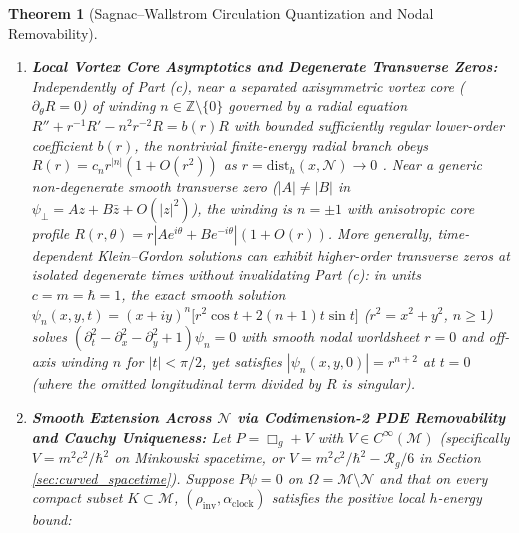 \documentclass[11pt, a4paper]{article}
\newtheorem{theorem}{Theorem}[section]
\theoremstyle{definition}
\begin{document}
\begin{theorem}[Sagnac--Wallstrom Circulation Quantization and Nodal Removability]
\begin{enumerate}[label=(\alph*)]
\begin{equation}
    \end{equation}
    enforcing the Wallstrom circulation condition $\oint_C dS = -mc^2 \Delta\tau_{\text{Sagnac}}(C) = 2\pi n \hbar$ (whereas on $\mathcal{U}_{\text{timelike}}$ the physical proper-time circulation is weighted by $m / M_{\text{eff}}(x)$, $\oint_C \beta_{\text{proper}} = \oint_C \frac{m}{M_{\text{eff}}(x)}\alpha_{\text{clock}}$, coinciding with $-n T_0$ when $M_{\text{eff}} = m$). On each connected component of $\Omega$, $(\rho_{\text{inv}}, \alpha_{\text{clock}})$ reconstructs a smooth non-vanishing complex field $\psi(x) = R(x)q(x) = \sqrt{\rho_{\text{inv}}(x)}\exp\left(\frac{i}{\hbar}\int_{x_0}^x dS\right) \in C^\infty(\Omega, \mathbb{C}^\times)$ unique up to a constant phase factor $e^{i\theta_0} \in U(1)$ per connected component.
    \item \textbf{Local Vortex Core Asymptotics and Degenerate Transverse Zeros:} Independently of Part (c), near a separated axisymmetric vortex core ($\partial_\theta R = 0$) of winding $n \in \mathbb{Z}\setminus\{0\}$ governed by a radial equation $R'' + r^{-1}R' - n^2 r^{-2}R = b(r)R$ with bounded sufficiently regular lower-order coefficient $b(r)$, the nontrivial finite-energy radial branch obeys $R(r) = c_n r^{|n|}(1 + O(r^2))$ as $r = \text{dist}_h(x, \mathcal{N}) \to 0$ \cite{Wallstrom1994, Schmelzer2011}. Near a generic non-degenerate smooth transverse zero ($|A| \neq |B|$ in $\psi_\perp = A z + B\bar{z} + O(|z|^2)$), the winding is $n = \pm 1$ with anisotropic core profile $R(r, \theta) = r\left|A e^{i\theta} + B e^{-i\theta}\right|(1 + O(r))$. More generally, time-dependent Klein--Gordon solutions can exhibit higher-order transverse zeros at isolated degenerate times without invalidating Part (c): in units $c = m = \hbar = 1$, the exact smooth solution $\psi_n(x, y, t) = (x + iy)^n\big[r^2\cos t + 2(n + 1)t\sin t\big]$ ($r^2 = x^2 + y^2$, $n \ge 1$) solves $(\partial_t^2 - \partial_x^2 - \partial_y^2 + 1)\psi_n = 0$ with smooth nodal worldsheet $r = 0$ and off-axis winding $n$ for $|t| < \pi/2$, yet satisfies $|\psi_n(x, y, 0)| = r^{n+2}$ at $t = 0$ (where the omitted longitudinal term divided by $R$ is singular).
    \item \textbf{Smooth Extension Across $\mathcal{N}$ via Codimension-2 PDE Removability and Cauchy Uniqueness:} Let $P = \Box_g + V$ with $V \in C^\infty(\mathcal{M})$ (specifically $V = m^2 c^2/\hbar^2$ on Minkowski spacetime, or $V = m^2 c^2/\hbar^2 - \mathcal{R}_g/6$ in Section \ref{sec:curved_spacetime}). Suppose $P\psi = 0$ on $\Omega = \mathcal{M}\setminus\mathcal{N}$ and that on every compact subset $K \subset \mathcal{M}$, $(\rho_{\text{inv}}, \alpha_{\text{clock}})$ satisfies the positive local $h$-energy bound:

\end{enumerate}
\end{theorem}
\end{document}
